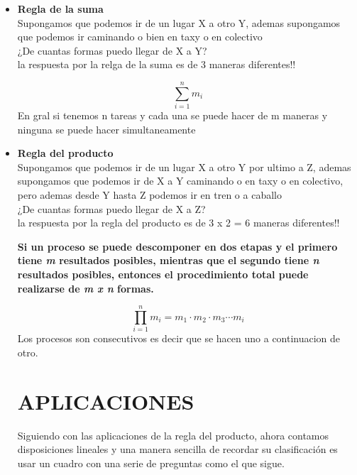 \documentclass[a4paper,12pt]{article}
\begin{document}
\begin{itemize}
\item \textbf{Regla de la suma}\\   
Supongamos que podemos ir de un lugar X a otro Y, ademas supongamos que podemos ir caminando o bien en taxy o en colectivo \\¿De cuantas formas puedo llegar de X a Y? \\ la respuesta por la relga de la suma es de 3 maneras diferentes!!
\begin{center}


\[
\sum_{i=1}^{n}m_{i}
\]
En gral si tenemos n tareas y cada una se puede hacer de m maneras y ninguna se puede hacer simultaneamente
\end{center}

\item \textbf{Regla del producto}\\  
Supongamos que podemos ir de un lugar X a otro Y por ultimo a Z, ademas supongamos que podemos ir de X a Y caminando o en taxy o en colectivo, pero ademas desde Y hasta Z podemos ir en tren o a caballo\\¿De cuantas formas puedo llegar de X a Z? \\ la respuesta por la regla del producto es de 3 x 2 = 6 maneras diferentes!!
\begin{center}
\textbf{
Si un proceso se puede descomponer en dos etapas y el primero tiene \textit{m} resultados posibles, mientras que el segundo tiene \textit{n} resultados posibles, entonces el procedimiento total puede realizarse de \textit{m x n} formas.}

\[
\prod_{i=1}^{n}m_{i}=m_{1}\cdot m_{2}\cdot m_{3} \cdots m_i 
\]
Los procesos son consecutivos es decir que se hacen uno a continuacion de otro.
\end{center}

\section{APLICACIONES}
Siguiendo con las aplicaciones de la regla del producto, ahora contamos disposiciones lineales y una manera sencilla de recordar su clasificaci\'on es usar un cuadro con una serie de preguntas como el que sigue.


\end{itemize}
\end{document}
